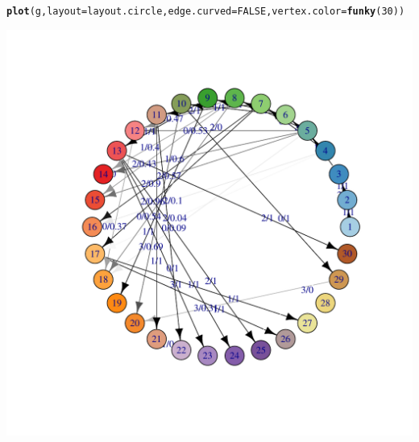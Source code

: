 \documentclass{article}\usepackage[]{graphicx}\usepackage[]{color}
\makeatletter
\newcommand{\hlnum}[1]{\textcolor[rgb]{0.686,0.059,0.569}{#1}}%
\newcommand{\hlstd}[1]{\textcolor[rgb]{0.345,0.345,0.345}{#1}}%
\newcommand{\hlkwc}[1]{\textcolor[rgb]{0.333,0.667,0.333}{#1}}%
\newcommand{\hlkwd}[1]{\textcolor[rgb]{0.737,0.353,0.396}{\textbf{#1}}}%
\newenvironment{kframe}{%
 \def\at@end@of@kframe{}%
 \ifinner\ifhmode%
  \def\at@end@of@kframe{\end{minipage}}%
  \begin{minipage}{\columnwidth}%
 \fi\fi%
 \def\FrameCommand##1{\hskip\@totalleftmargin \hskip-\fboxsep
 \colorbox{shadecolor}{##1}\hskip-\fboxsep
     \hskip-\linewidth \hskip-\@totalleftmargin \hskip\columnwidth}%
 \MakeFramed {\advance\hsize-\width
   \@totalleftmargin\z@ \linewidth\hsize
   \@setminipage}}%
 {\par\unskip\endMakeFramed%
 \at@end@of@kframe}
\newenvironment{knitrout}{}{} %
\makeatother
\begin{document}
\begin{knitrout}
\color{fgcolor}\begin{kframe}
\begin{alltt}
\hlkwd{plot}\hlstd{(g,} \hlkwc{layout}\hlstd{=layout.circle,} \hlkwc{edge.curved}\hlstd{=}\hlnum{FALSE}\hlstd{,} \hlkwc{vertex.color}\hlstd{=}\hlkwd{funky}\hlstd{(}\hlnum{30}\hlstd{))}
\end{alltt}
\end{kframe}

{\centering \includegraphics[width=.6\textwidth]{figs/unnamed-chunk-19} 

}



\end{knitrout}
\end{document}
